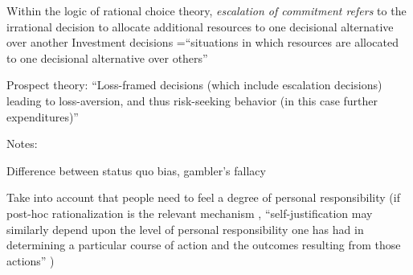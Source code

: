 

Within the logic of rational choice theory, \textit{escalation of commitment refers} to the irrational decision to allocate additional  resources to one decisional alternative over another 
Investment decisions =\enquote{situations in which resources are allocated to one decisional alternative over others} \parencite[p. 28]{Staw1976}


Prospect theory: \enquote{Loss-framed decisions (which include escalation decisions) leading to loss-aversion, and thus risk-seeking behavior (in this case further expenditures)} \parencite[][p. 544]{Sleesman2012}




Notes:

Difference between status quo bias, gambler's fallacy

Take into account that people need to feel a degree of personal responsibility (if post-hoc rationalization is the relevant mechanism , \enquote{self-justification  may similarly depend upon the level of personal responsibility one has had in determining a particular course of action and the outcomes resulting from those actions} ) \parencite[][p. 30]{Staw1976}
